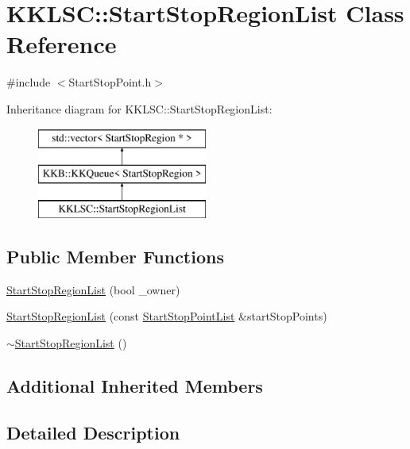 \hypertarget{class_k_k_l_s_c_1_1_start_stop_region_list}{}\section{K\+K\+L\+SC\+:\+:Start\+Stop\+Region\+List Class Reference}
\label{class_k_k_l_s_c_1_1_start_stop_region_list}


{\ttfamily \#include $<$Start\+Stop\+Point.\+h$>$}

Inheritance diagram for K\+K\+L\+SC\+:\+:Start\+Stop\+Region\+List\+:\begin{figure}[H]
\begin{center}
\leavevmode
\includegraphics[height=3.000000cm]{class_k_k_l_s_c_1_1_start_stop_region_list}
\end{center}
\end{figure}
\subsection*{Public Member Functions}
\begin{DoxyCompactItemize}
\item 
\hyperlink{class_k_k_l_s_c_1_1_start_stop_region_list_afe004033988e8ec563090d2ca27d043f}{Start\+Stop\+Region\+List} (bool \+\_\+owner)
\item 
\hyperlink{class_k_k_l_s_c_1_1_start_stop_region_list_a88c7c2dccbe3b2a609971baf216846aa}{Start\+Stop\+Region\+List} (const \hyperlink{class_k_k_l_s_c_1_1_start_stop_point_list}{Start\+Stop\+Point\+List} \&start\+Stop\+Points)
\item 
\hyperlink{class_k_k_l_s_c_1_1_start_stop_region_list_a5b05fa2d63bf9c81a0e52fd4077acf18}{$\sim$\+Start\+Stop\+Region\+List} ()
\end{DoxyCompactItemize}
\subsection*{Additional Inherited Members}


\subsection{Detailed Description}


